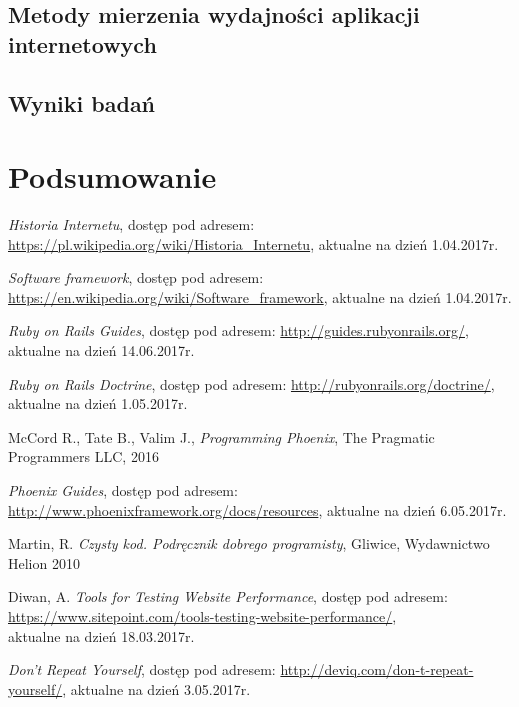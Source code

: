 \documentclass[mgr,oneside]{mgr}
\begin{document}
\section{Metody mierzenia wydajności aplikacji internetowych}
\section{Wyniki badań}

\chapter{Podsumowanie}
\renewcommand\bibname{Literatura}
\begin{thebibliography}{inteligencja}

  \emph{Historia Internetu}, dostęp pod adresem: \url{https://pl.wikipedia.org/wiki/Historia_Internetu}, aktualne na dzień 1.04.2017r.

  \emph{Software framework}, dostęp pod adresem: \url{https://en.wikipedia.org/wiki/Software_framework}, aktualne na dzień 1.04.2017r.

	\emph{Ruby on Rails Guides}, dostęp pod adresem: \url{http://guides.rubyonrails.org/},\\ aktualne na dzień 14.06.2017r.

  \emph{Ruby on Rails Doctrine}, dostęp pod adresem: \url{http://rubyonrails.org/doctrine/}, aktualne na dzień 1.05.2017r.

  McCord R., Tate B., Valim J., \emph{Programming Phoenix}, The Pragmatic Programmers LLC, 2016

  \emph{Phoenix Guides}, dostęp pod adresem: \url{http://www.phoenixframework.org/docs/resources}, aktualne na dzień 6.05.2017r.

	Martin, R. \emph{Czysty kod. Podręcznik dobrego programisty}, Gliwice, Wydawnictwo Helion 2010

  Diwan, A. \emph{Tools for Testing Website Performance}, dostęp pod adresem: \url{https://www.sitepoint.com/tools-testing-website-performance/}, \\ aktualne na dzień 18.03.2017r.

  \emph{Don't Repeat Yourself}, dostęp pod adresem: \url{http://deviq.com/don-t-repeat-yourself/}, aktualne na dzień 3.05.2017r.


\end{thebibliography}
\end{document}
